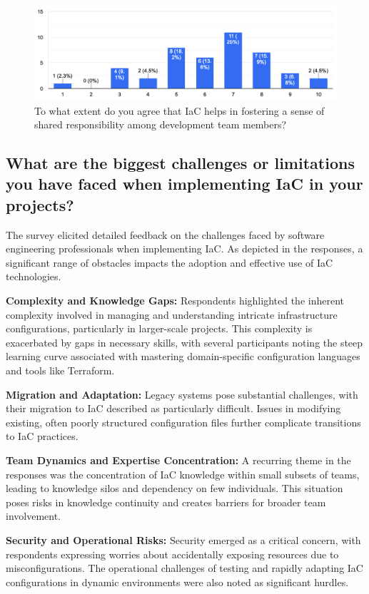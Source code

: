 \begin{figure}[h!]
\centering
\includegraphics[width=\linewidth]{Images/Survey/iac_3.png}
\caption{To what extent do you agree that IaC helps in fostering a sense of shared responsibility among development team members?}
\label{fig:results:iac:3}
\end{figure}

\pagebreak

\subsection*{What are the biggest challenges or limitations you have faced when implementing IaC in your projects?}
The survey elicited detailed feedback on the challenges faced by software engineering professionals when implementing \ac{IaC}. As depicted in the responses, a significant range of obstacles impacts the adoption and effective use of \ac{IaC} technologies.

\textbf{Complexity and Knowledge Gaps:} Respondents highlighted the inherent complexity involved in managing and understanding intricate infrastructure configurations, particularly in larger-scale projects. This complexity is exacerbated by gaps in necessary skills, with several participants noting the steep learning curve associated with mastering domain-specific configuration languages and tools like Terraform.

\textbf{Migration and Adaptation:} Legacy systems pose substantial challenges, with their migration to \ac{IaC} described as particularly difficult. Issues in modifying existing, often poorly structured configuration files further complicate transitions to \ac{IaC} practices.

\textbf{Team Dynamics and Expertise Concentration:} A recurring theme in the responses was the concentration of \ac{IaC} knowledge within small subsets of teams, leading to knowledge silos and dependency on few individuals. This situation poses risks in knowledge continuity and creates barriers for broader team involvement.

\textbf{Security and Operational Risks:} Security emerged as a critical concern, with respondents expressing worries about accidentally exposing resources due to misconfigurations. The operational challenges of testing and rapidly adapting \ac{IaC} configurations in dynamic environments were also noted as significant hurdles.

